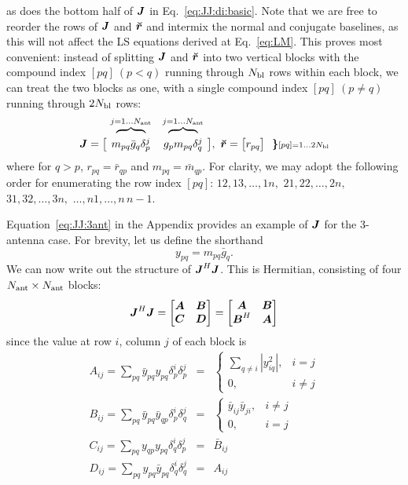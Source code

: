 \documentclass[useAMS,usenatbib]{mn2e}
\makeatletter
\newcommand{\mat}[1]{{\bmath{#1}}}
\newcommand{\JJ}{\mat{J}} %
\newcommand{\Matrix}[2]{\left [ \begin{array}{@{}#1@{}}#2\end{array} \right ]}
\newcommand{\AUG}[1]{\bmath{\breve{#1}}}
\newcommand{\Rr}{\AUG{r}}
\numberwithin{equation}{section}
\providecommand{\DIFaddbegin}{} %
\providecommand{\DIFaddend}{} %
\providecommand{\DIFdelbegin}{} %
\providecommand{\DIFdelend}{} %
\makeatother
\begin{document}
as does the bottom half of $\JJ$ in Eq.~\ref{eq:JJ:di:basic}. Note that we are free to reorder the rows of $\JJ$ and $\Rr$ 
and intermix the normal and conjugate baselines, as this will not affect the LS equations derived at Eq.~\ref{eq:LM}.
This proves most convenient: instead of splitting $\JJ$ and $\Rr$ into 
two vertical blocks with the compound index $[pq]~(p<q)$ running through $N_\mathrm{bl}$ rows within each block, we can treat 
the two blocks as one, with a single compound index $[pq]~(p\ne q)$ running through $2N_\mathrm{bl}$ rows:
\begin{equation}
\label{eq:JJ:di}
\begin{array}{r@{~}cc@{~}cc}
                & \overbrace{~~~~~~~~}^{j=1\dots \Na} & \overbrace{~~~~~~~~}^{j=1\dots \Na} \\
\JJ = \big [ & m_{pq}\bar{g}_q\delta^{j}_p & g_p m_{pq} \delta^{j}_q & \big ],~
\Rr = \big [ r_{pq} \big ] ~~{\DIFdelbegin %
\DIFdelend \DIFaddbegin \bm{\}} \DIFaddend \scriptstyle [pq]=1\dots 2\Nbl}
\end{array}
\end{equation}
where for $q>p$, $r_{pq}=\bar{r}_{qp}$ and $m_{pq}=\bar{m}_{qp}$. For clarity, we may adopt the 
following order for enumerating the row index $[pq]$: $12,13,\dots,1n,$ $21,22,\dots,2n,$ $31,32,\dots,3n,$ $\dots,n1,\dots,n\,n-1$. 

Equation~\ref{eq:JJ:3ant} in the Appendix provides an example of $\JJ$ for the 3-antenna case. For
brevity, let us define the shorthand 
\begin{equation}
y_{pq} = m_{pq} \bar{g}_q. 
\end{equation}
We can now write out the 
structure of $\JJ^H\JJ$. This is Hermitian, consisting of four $N_\mathrm{ant}\times N_\mathrm{ant}$ blocks:
\begin{equation}
\label{eq:JHJ:DI:ABCD}
\JJ^H\JJ = \Matrix{cc}{\mat{A}&\mat{B}\\\mat{C}&\mat{D}} = \Matrix{cc}{\mat{A}&\mat{B}\\\mat{B}^H&\mat{A}}
\end{equation}
since the value at row $i$, column $j$ of each block is
\begin{eqnarray}
A_{ij} = \sum_{pq} \bar{y}_{pq} y_{pq} \delta^{i}_p \delta^{j}_p &=& 
  \left \{ \begin{array}{cc}
        \sum\limits_{q\ne i} |y_{iq}^2|, & \scriptstyle i=j \\
        0,  & \scriptstyle  i\ne j
  \end{array} \right .\nonumber\\ 
B_{ij} = \sum_{pq} \bar{y}_{pq} \bar{y}_{qp} \delta^{i}_p \delta^{j}_q &=& 
  \left \{ \begin{array}{cc}
      \bar{y}_{ij} \bar{y}_{ji}, & \scriptstyle i\ne j\\
      0, & \scriptstyle i=j
  \end{array} \right .\nonumber\\ 
C_{ij} = \sum_{pq} y_{qp} y_{pq} \delta^{i}_q \delta^{j}_p &=& 
  \bar{B}_{ij} \nonumber\\
D_{ij} = \sum_{pq} y_{pq} \bar{y}_{pq} \delta^{i}_q \delta^{j}_q &=& A_{ij} 
\label{eq:JHJ:DI:ABCD1}
\end{eqnarray}
\end{document}
